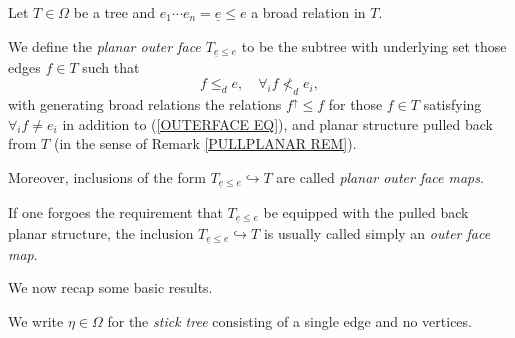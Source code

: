 \documentclass[a4paper,10pt]{article}%
\begin{document}
\begin{definition}\label{OUTFACE DEF}
	Let $T \in \Omega$ be a tree and 
	$e_1 \cdots e_n =\underline{e} \leq e$ a broad relation in $T$.
	
	We define the \textit{planar outer face $T_{\underline{e} \leq e}$}
	to be the subtree with underlying set those edges $f \in T$ such that
\begin{equation}\label{OUTERFACE EQ}
	f \leq_d e,\quad \forall_i f \nless_d e_i,
\end{equation}
with generating broad relations the relations $f^{\uparrow} \leq f$ for those $f \in T$ satisfying
$\forall_i f\neq e_i$
in addition to (\ref{OUTERFACE EQ}),
and planar structure pulled back from $T$ (in the sense of Remark \ref{PULLPLANAR REM}).

Moreover, inclusions of the form 
$T_{\underline{e} \leq e}
\hookrightarrow T$
are called \emph{planar outer face maps}.
\end{definition}


\begin{remark}
If one forgoes the requirement that $T_{\underline{e} \leq e}$ be equipped with the pulled back planar structure, the inclusion $T_{\underline{e} \leq e} \hookrightarrow T$ is usually called simply an \textit{outer face map}.
\end{remark}


We now recap some basic results.


\begin{notation}\label{STICKTRE NOT}
	We write $\eta \in \Omega$
	for the \emph{stick tree} 
	consisting of a single edge and no vertices.
\end{notation}
\end{document}
